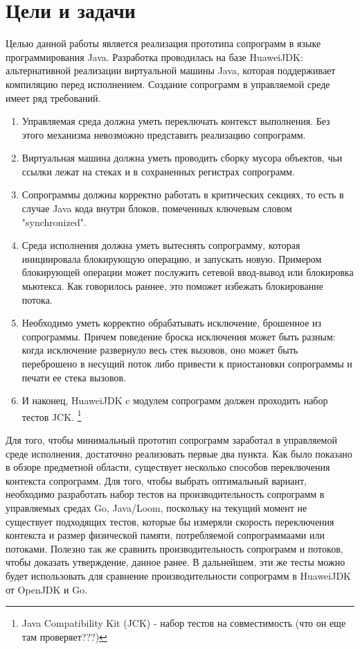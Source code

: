 \section{Цели и задачи}
	Целью данной работы является реализация прототипа сопрограмм в языке программирования Java. Разработка
	проводилась на базе HuaweiJDK: альтернативной реализации виртуальной машины Java, которая поддерживает компиляцию перед
	исполнением. Создание сопрограмм в управляемой среде имеет ряд требований. 
	\begin{enumerate}[align=left]
		\item Управляемая среда должна уметь переключать контекст выполнения. Без этого механизма
		невозможно представить реализацию сопрограмм.
		\item Виртуальная машина должна уметь проводить сборку мусора объектов, чьи ссылки лежат на стеках и в сохраненных
		регистрах сопрограмм. 
		\item Сопрограммы должны корректно работать в критических секциях, то есть в случае Java кода внутри блоков,
		помеченных ключевым словом "synchronized".
		\item Среда исполнения должна уметь вытеснять сопрограмму, которая инициировала блокирующую операцию, и
		запускать новую. Примером блокирующей операции может послужить сетевой ввод-вывод или блокировка мьютекса.
		Как говорилось раннее, это поможет избежать блокирование потока.
		\item Необходимо уметь корректно обрабатывать исключение, брошенное из сопрограммы. Причем поведение броска
		исключения может быть разным: когда исключение развернуло весь стек вызовов, оно может быть переброшено в
		несущий поток либо привести к приостановки сопрограммы и печати ее стека вызовов.
		\item И наконец, HuaweiJDK c модулем сопрограмм должен проходить набор тестов JCK.
		\footnote{Java Compatibility Kit (JCK) - набор тестов на совместимость (что он еще там проверяет???)}
	\end{enumerate}
	
	Для того, чтобы минимальный прототип сопрограмм заработал в управляемой среде исполнения, достаточно реализовать первые два пункта. Как было показано в обзоре предметной области, существует несколько способов
	переключения контекста сопрограмм. Для того, чтобы выбрать оптимальный вариант, необходимо разработать набор тестов на производительность сопрограмм в управляемых средах Go, Java/Loom, поскольку на текущий момент не
	существует подходящих
	тестов, которые бы измеряли скорость переключения контекста и размер физической памяти, потребляемой сопрограммаами или потоками.
	Полезно так же сравнить производительность сопрограмм и потоков, чтобы доказать утверждение, данное ранее. В дальнейшем, эти же
	тесты можно будет использовать для сравнение производительности сопрограмм в HuaweiJDK от OpenJDK и Go.
	
